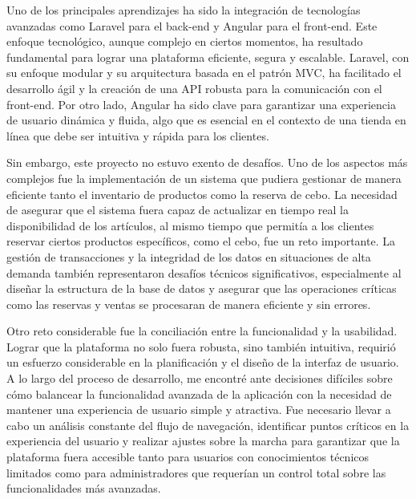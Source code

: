\vspace{0.5cm}

Uno de los principales aprendizajes ha sido la integración de tecnologías avanzadas como Laravel para el back-end y Angular para el front-end. Este enfoque tecnológico, aunque complejo en ciertos momentos, ha resultado fundamental para lograr una plataforma eficiente, segura y escalable. Laravel, con su enfoque modular y su arquitectura basada en el patrón MVC, ha facilitado el desarrollo ágil y la creación de una API robusta para la comunicación con el front-end. Por otro lado, Angular ha sido clave para garantizar una experiencia de usuario dinámica y fluida, algo que es esencial en el contexto de una tienda en línea que debe ser intuitiva y rápida para los clientes.

\vspace{0.5cm}

Sin embargo, este proyecto no estuvo exento de desafíos. Uno de los aspectos más complejos fue la implementación de un sistema que pudiera gestionar de manera eficiente tanto el inventario de productos como la reserva de cebo. La necesidad de asegurar que el sistema fuera capaz de actualizar en tiempo real la disponibilidad de los artículos, al mismo tiempo que permitía a los clientes reservar ciertos productos específicos, como el cebo, fue un reto importante. La gestión de transacciones y la integridad de los datos en situaciones de alta demanda también representaron desafíos técnicos significativos, especialmente al diseñar la estructura de la base de datos y asegurar que las operaciones críticas como las reservas y ventas se procesaran de manera eficiente y sin errores.

\vspace{0.5cm}

Otro reto considerable fue la conciliación entre la funcionalidad y la usabilidad. Lograr que la plataforma no solo fuera robusta, sino también intuitiva, requirió un esfuerzo considerable en la planificación y el diseño de la interfaz de usuario. A lo largo del proceso de desarrollo, me encontré ante decisiones difíciles sobre cómo balancear la funcionalidad avanzada de la aplicación con la necesidad de mantener una experiencia de usuario simple y atractiva. Fue necesario llevar a cabo un análisis constante del flujo de navegación, identificar puntos críticos en la experiencia del usuario y realizar ajustes sobre la marcha para garantizar que la plataforma fuera accesible tanto para usuarios con conocimientos técnicos limitados como para administradores que requerían un control total sobre las funcionalidades más avanzadas.

